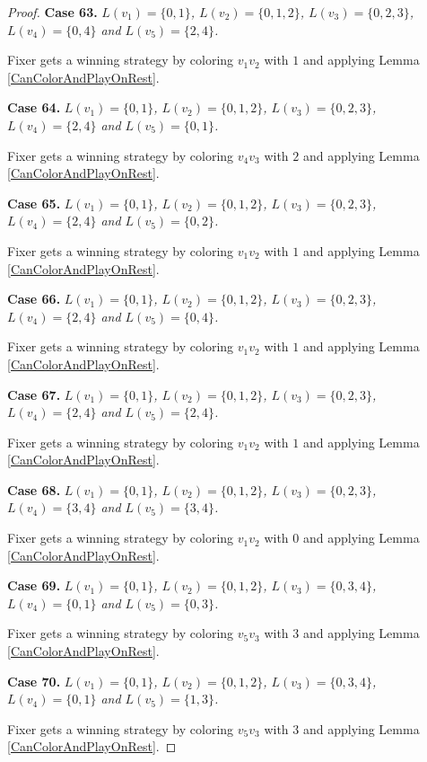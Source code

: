 \documentclass[12pt]{amsart}
\theoremstyle{plain}
\theoremstyle{definition}
\theoremstyle{remark}
\begin{document}
\begin{proof}
\noindent\textbf{Case 63.  }\textit{$L(v_1) = \{0, 1\}$, $L(v_2) = \{0, 1, 2\}$, $L(v_3) = \{0, 2, 3\}$, $L(v_4) = \{0, 4\}$ and $L(v_5) = \{2, 4\}$.}

Fixer gets a winning strategy by coloring $v_1v_2$ with $1$ and applying Lemma \ref{CanColorAndPlayOnRest}.

\noindent\textbf{Case 64.  }\textit{$L(v_1) = \{0, 1\}$, $L(v_2) = \{0, 1, 2\}$, $L(v_3) = \{0, 2, 3\}$, $L(v_4) = \{2, 4\}$ and $L(v_5) = \{0, 1\}$.}

Fixer gets a winning strategy by coloring $v_4v_3$ with $2$ and applying Lemma \ref{CanColorAndPlayOnRest}.

\noindent\textbf{Case 65.  }\textit{$L(v_1) = \{0, 1\}$, $L(v_2) = \{0, 1, 2\}$, $L(v_3) = \{0, 2, 3\}$, $L(v_4) = \{2, 4\}$ and $L(v_5) = \{0, 2\}$.}

Fixer gets a winning strategy by coloring $v_1v_2$ with $1$ and applying Lemma \ref{CanColorAndPlayOnRest}.

\noindent\textbf{Case 66.  }\textit{$L(v_1) = \{0, 1\}$, $L(v_2) = \{0, 1, 2\}$, $L(v_3) = \{0, 2, 3\}$, $L(v_4) = \{2, 4\}$ and $L(v_5) = \{0, 4\}$.}

Fixer gets a winning strategy by coloring $v_1v_2$ with $1$ and applying Lemma \ref{CanColorAndPlayOnRest}.

\noindent\textbf{Case 67.  }\textit{$L(v_1) = \{0, 1\}$, $L(v_2) = \{0, 1, 2\}$, $L(v_3) = \{0, 2, 3\}$, $L(v_4) = \{2, 4\}$ and $L(v_5) = \{2, 4\}$.}

Fixer gets a winning strategy by coloring $v_1v_2$ with $1$ and applying Lemma \ref{CanColorAndPlayOnRest}.

\noindent\textbf{Case 68.  }\textit{$L(v_1) = \{0, 1\}$, $L(v_2) = \{0, 1, 2\}$, $L(v_3) = \{0, 2, 3\}$, $L(v_4) = \{3, 4\}$ and $L(v_5) = \{3, 4\}$.}

Fixer gets a winning strategy by coloring $v_1v_2$ with $0$ and applying Lemma \ref{CanColorAndPlayOnRest}.

\noindent\textbf{Case 69.  }\textit{$L(v_1) = \{0, 1\}$, $L(v_2) = \{0, 1, 2\}$, $L(v_3) = \{0, 3, 4\}$, $L(v_4) = \{0, 1\}$ and $L(v_5) = \{0, 3\}$.}

Fixer gets a winning strategy by coloring $v_5v_3$ with $3$ and applying Lemma \ref{CanColorAndPlayOnRest}.

\noindent\textbf{Case 70.  }\textit{$L(v_1) = \{0, 1\}$, $L(v_2) = \{0, 1, 2\}$, $L(v_3) = \{0, 3, 4\}$, $L(v_4) = \{0, 1\}$ and $L(v_5) = \{1, 3\}$.}

Fixer gets a winning strategy by coloring $v_5v_3$ with $3$ and applying Lemma \ref{CanColorAndPlayOnRest}.


\end{proof}
\end{document}
